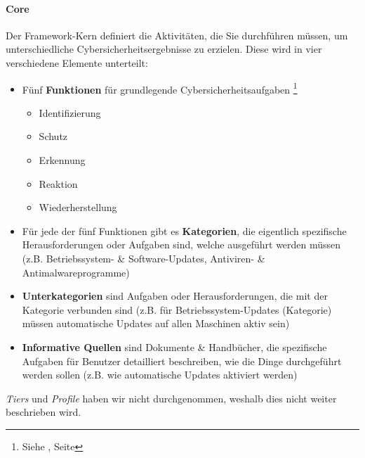 \documentclass[10pt,a4paper]{article}
\begin{document}
\paragraph*{Core}\label{para:NISTcore}Der Framework-Kern definiert die Aktivitäten, die Sie durchführen müssen, um unterschiedliche Cybersicherheitsergebnisse zu erzielen. Diese wird in vier verschiedene Elemente unterteilt:
\begin{itemize}[noitemsep,topsep=0pt,leftmargin=*]
    \item Fünf \textbf{Funktionen} für grundlegende Cybersicherheitsaufgaben \footnote{{Siehe \underline{}, Seite \pageref{nistfunctions}}}
    \begin{itemize}[noitemsep,topsep=0pt,leftmargin=*]
        \item Identifizierung
        \item Schutz
        \item Erkennung
        \item Reaktion
        \item Wiederherstellung
    \end{itemize}
    \item Für jede der fünf Funktionen gibt es \textbf{Kategorien}, die eigentlich spezifische Herausforderungen oder Aufgaben sind, welche ausgeführt werden müssen (z.B. Betriebssystem- \& Software-Updates, Antiviren- \& Antimalwareprogramme)
    \item \textbf{Unterkategorien} sind Aufgaben oder Herausforderungen, die mit der Kategorie verbunden sind (z.B. für Betriebssystem-Updates (Kategorie) müssen automatische Updates auf allen Maschinen aktiv sein)
    \item \textbf{Informative Quellen } sind Dokumente \& Handbücher, die spezifische Aufgaben für Benutzer detailliert beschreiben, wie die Dinge durchgeführt werden sollen (z.B. wie automatische Updates aktiviert werden)
\end{itemize}
\textsl{Tiers} und \textsl{Profile} haben wir nicht durchgenommen, weshalb dies nicht weiter beschrieben wird.
\end{document}
